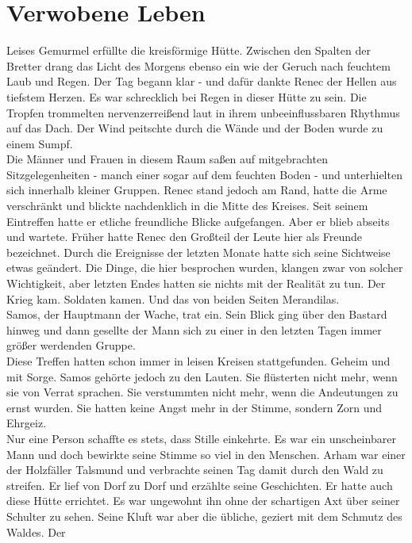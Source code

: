 \chapter{Verwobene Leben}

Leises Gemurmel erfüllte die kreisförmige Hütte. Zwischen den Spalten der Bretter drang das Licht 
des Morgens ebenso ein wie der Geruch nach feuchtem Laub und Regen. Der Tag begann klar - und 
dafür dankte Renec der Hellen aus tiefstem Herzen. Es war schrecklich bei Regen in dieser Hütte zu 
sein. Die Tropfen trommelten nervenzerreißend laut in ihrem unbeeinflussbaren Rhythmus auf das Dach. 
Der Wind peitschte durch die Wände und der Boden wurde zu einem Sumpf.\\
Die Männer und Frauen in diesem Raum saßen auf mitgebrachten Sitzgelegenheiten - manch einer sogar 
auf dem feuchten Boden - und unterhielten sich innerhalb kleiner Gruppen. Renec stand jedoch am 
Rand, hatte die Arme verschränkt und blickte nachdenklich in die Mitte des Kreises. Seit seinem 
Eintreffen hatte er etliche freundliche Blicke aufgefangen. Aber er blieb abseits und 
wartete. Früher hatte Renec den Großteil der Leute hier als Freunde bezeichnet. 
Durch die Ereignisse der letzten Monate hatte sich seine Sichtweise etwas geändert. Die Dinge, die 
hier besprochen wurden, klangen zwar von solcher Wichtigkeit, aber letzten Endes hatten sie nichts 
mit der Realität zu tun. Der Krieg kam. Soldaten kamen. Und das von beiden Seiten Merandilas.\\
Samos, der Hauptmann der Wache, trat ein. Sein Blick ging über den Bastard hinweg und dann gesellte 
der Mann sich zu einer in den letzten Tagen immer größer werdenden Gruppe.\\
Diese Treffen hatten schon immer in leisen Kreisen stattgefunden. Geheim und mit Sorge. Samos 
gehörte jedoch zu den Lauten. Sie flüsterten nicht mehr, wenn sie von Verrat sprachen. Sie 
verstummten nicht mehr, wenn die Andeutungen zu ernst wurden. Sie hatten keine Angst mehr in der 
Stimme, sondern Zorn und Ehrgeiz.\\
Nur eine Person schaffte es stets, dass Stille einkehrte. Es war ein unscheinbarer Mann und doch 
bewirkte seine Stimme so viel in den Menschen. Arham war einer der Holzfäller Talsmund und 
verbrachte seinen Tag damit durch den Wald zu streifen. Er lief von Dorf zu Dorf und erzählte seine 
Geschichten. Er hatte auch diese Hütte errichtet. Es war ungewohnt ihn ohne der schartigen Axt über 
seiner Schulter zu sehen. Seine Kluft war aber die übliche, geziert mit dem Schmutz des Waldes. Der 
